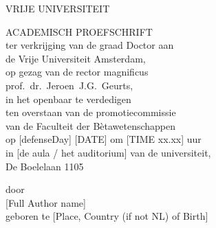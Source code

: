 \begin{titlepage}

\begin{center}

\vspace{30mm}

{\makeatletter
\titlestyle\bfseries\LARGE\@title
\makeatother}

{\makeatletter
\ifx\@subtitle\undefined\else
    \medskip
    \titlefont\titleshape\Large\@subtitle
\fi
\makeatother}

\end{center}





\cleardoublepage
\thispagestyle{empty}
\begin{center}

\Large{VRIJE UNIVERSITEIT}\\
\vspace{18mm}

{\makeatletter
\titlestyle\bfseries\LARGE\@title
\makeatother}

{\makeatletter
\ifx\@subtitle\undefined\else
    \titlefont\titleshape\Large\@subtitle
\fi
\makeatother}

\vspace{25mm}

\Large{ACADEMISCH PROEFSCHRIFT}\\
\vspace{6mm}
\large ter verkrijging van de graad {D}octor aan\\
de {V}rije {U}niversiteit {A}msterdam,\\
op gezag van de rector magnificus\\
prof.~dr.~Jeroen~J.G.~Geurts,\\ 
in het openbaar te verdedigen\\       
ten overstaan van de promotiecommissie\\
van de Faculteit der B\`{e}tawetenschappen\\        
op [defenseDay] [DATE] om [TIME xx.xx] uur \\      
in [de aula / het auditorium] van de universiteit,\\
De Boelelaan 1105\\
\par\vspace {4cm}


\linespread{1.8}
\large door\\ {\LARGE [Full Author name]}\\
\large geboren te [Place, Country (if not NL) of Birth]

\end{center}



\end{titlepage}

